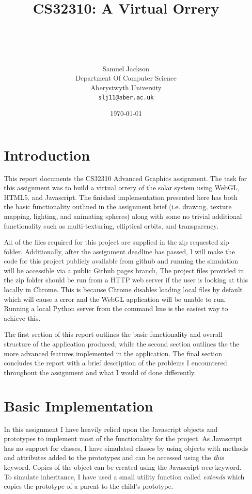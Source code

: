 \documentclass[paper=a4, fontsize=11pt]{scrartcl}	%
\title{ \vspace{-1in} 	\usefont{OT1}{bch}{b}{n}
		\huge \strut CS32310: A Virtual Orrery\strut \\
}
\author{ 									\usefont{OT1}{bch}{m}{n}
        Samuel Jackson\\		\usefont{OT1}{bch}{m}{n}
		Department Of Computer Science\\	\usefont{OT1}{bch}{m}{n}
        Aberystwyth University\\
        \texttt{slj11@aber.ac.uk}
}
\date{\today}
\numberwithin{equation}{section}															%
\numberwithin{figure}{section}																%
\numberwithin{table}{section}																%
\begin{document}
\maketitle

\section{Introduction}
This report documents the CS32310 Advanced Graphics assignment. The task for this assignment was to build a virtual orrery of the solar system using WebGL, HTML5, and Javascript. The finished implementation presented here has both the basic functionality outlined in the assignment brief (i.e. drawing, texture mapping, lighting, and animating spheres) along with some no trivial additional functionality such as multi-texturing, elliptical orbits, and transparency. 

All of the files required for this project are supplied in the zip requested zip folder. Additionally, after the assignment deadline has passed, I will make the code for this project publicly available from github \cite{github} and running the simulation will be accessible via a public Github pages branch, The project files provided in the zip folder should be run from a HTTP web server if the user is looking at this locally in Chrome. This is because Chrome disables loading local files by default which will cause a error and the WebGL application will be unable to run. Running a local Python server from the command line is the easiest way to achieve this.

The first section of this report outlines the basic functionality and overall structure of the application produced, while the second section outlines the the more advanced features implemented in the application. The final section concludes the report with a brief description of the problems I encountered throughout the assignment and what I would of done differently.

\section{Basic Implementation}
In this assignment I have heavily relied upon the Javascript objects and prototypes to implement most of the functionality for the project. As Javascript has no support for classes, I have simulated classes by using objects with methods and attributes added to the prototypes and can be accessed using the \textit{this} keyword. Copies of the object can be created using the Javascript \textit{new} keyword. To simulate inheritance, I have used a small utility function called \textit{extends} which copies the prototype of a parent to the child's prototype.
\end{document}
